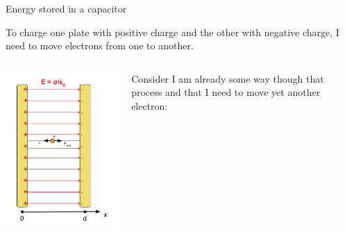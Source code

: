 \begin{frame}{Energy stored in a capacitor}

To charge one plate with positive charge and the other with negative charge,
I need to move electrons from one to another.\\

\begin{columns}
  \begin{column}{0.35\textwidth}
   \begin{center}
     \includegraphics[width=0.99\textwidth]{./images/schematics/parallel_plate_capacitor_work.png}\\
   \end{center}
  \end{column}
  \begin{column}{0.65\textwidth}
  {\small
     Consider I am already some way though that process and that I need to move yet another electron:
}
\end{column}
\end{columns}
\end{frame}
